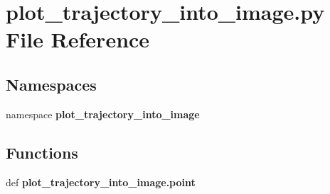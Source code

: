 \section{plot\-\_\-trajectory\-\_\-into\-\_\-image.\-py \-File \-Reference}
\label{plot__trajectory__into__image_8py}
\subsection*{\-Namespaces}
\begin{DoxyCompactItemize}
\item 
namespace {\bf plot\-\_\-trajectory\-\_\-into\-\_\-image}
\end{DoxyCompactItemize}
\subsection*{\-Functions}
\begin{DoxyCompactItemize}
\item 
def {\bf plot\-\_\-trajectory\-\_\-into\-\_\-image.\-point}
\end{DoxyCompactItemize}
